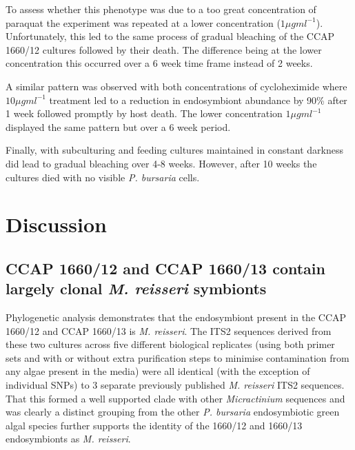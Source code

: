 To assess whether this phenotype was due to a too great concentration of paraquat
the experiment was repeated at a lower concentration  (\(1\mu g ml^{-1}\)).
Unfortunately, this led to the same process of gradual bleaching of the CCAP 
1660/12 cultures followed by their death. The difference being at the lower concentration
this occurred over a 6 week time frame instead of 2 weeks.


A similar pattern was observed with both concentrations of
cycloheximide where \(10\mu g ml^{-1}\) treatment 
led to a reduction in endosymbiont abundance by 90\%
after 1 week followed promptly by host death. 
The lower concentration \(1\mu g ml^{-1}\) 
displayed the same pattern but over a 6 week period.

Finally, with subculturing and feeding cultures maintained in 
constant darkness did lead to gradual bleaching over 4-8 weeks.
However, after 10 weeks the cultures died with no visible
\textit{P. bursaria} cells.


\section{Discussion}

\subsection{CCAP 1660/12 and CCAP 1660/13 contain largely clonal \textit{M. reisseri} symbionts}

Phylogenetic analysis demonstrates that the endosymbiont present in the CCAP 1660/12
and CCAP 1660/13 is \textit{M. reisseri}.  The ITS2 sequences derived from these
two cultures across five different biological replicates (using both primer sets and with or without 
extra purification steps to minimise contamination from any algae present in the media) 
were all identical (with the exception of individual SNPs) 
to 3 separate previously published \textit{M. reisseri} ITS2 sequences. That this formed
a well supported clade with other \textit{Micractinium} sequences and was clearly a distinct
grouping from the other \textit{P. bursaria} endosymbiotic green algal species 
further supports the identity of the 1660/12 and 1660/13 endosymbionts as \textit{M. reisseri}.

